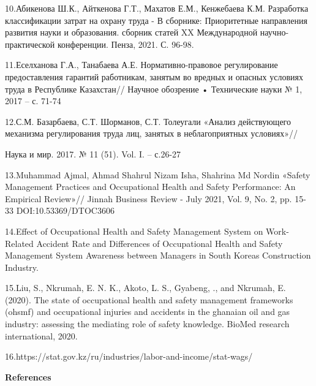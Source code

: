 \begin{noparindent}
10.Абикенова Ш.К., Айткенова Г.Т., Махатов Е.М., Кенжебаева К.М.
Разработка классификации затрат на охрану труда - В сборнике:
Приоритетные направления развития науки и образования. сборник статей XX
Международной научно-практической конференции. Пенза, 2021. С. 96-98.

11.Еселханова Г.А., Танабаева А.Е. Нормативно-правовое регулирование
предоставления гарантий работникам, занятым во вредных и опасных
условиях труда в Республике Казахстан// Научное обозрение • Технические
науки № 1, 2017 -- с. 71-74

12.С.М. Базарбаева, С.Т. Шорманов, С.Т. Толеугали «Анализ действующего
механизма регулирования труда лиц, занятых в неблагоприятных условиях»//

Наука и мир. 2017. № 11 (51). Vol. I. -- с.26-27

13.Muhammad Ajmal, Ahmad Shahrul Nizam Isha, Shahrina Md Nordin «Safety
Management Practices and Occupational Health and Safety Performance: An
Empirical Review»// Jinnah Business Review - July 2021, Vol. 9, No. 2,
pp. 15-33 DOI:10.53369/DTOC3606

14.Effect of Occupational Health and Safety Management System on
Work-Related Accident Rate and Differences of Occupational Health and
Safety Management System Awareness between Managers in South
Korea\textquotesingle s Construction Industry.

15.Liu, S., Nkrumah, E. N. K., Akoto, L. S., Gyabeng, ., and Nkrumah, E.
(2020). The state of occupational health and safety management
frameworks (ohsmf) and occupational injuries and accidents in the
ghanaian oil and gas industry: assessing the mediating role of safety
knowledge. BioMed research international, 2020.

16.https://stat.gov.kz/ru/industries/labor-and-income/stat-wags/
\end{noparindent}

\begin{center}
{\bfseries References}
\end{center}

